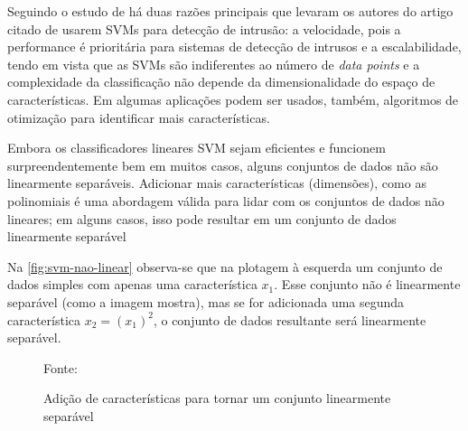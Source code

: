 Seguindo o estudo de  há duas razões principais que levaram os autores do artigo citado de usarem SVMs para detecção de intrusão: a velocidade, pois a performance é prioritária para sistemas de detecção de intrusos e a escalabilidade, tendo em vista que as SVMs são indiferentes ao número de \textit{data points} e a complexidade da classificação não depende da dimensionalidade do espaço de características. Em algumas aplicações podem ser usados, também, algoritmos de otimização para identificar mais características.


Embora os classificadores lineares SVM sejam eficientes e funcionem surpreendentemente bem em muitos casos, alguns conjuntos de dados não são linearmente separáveis. Adicionar mais características (dimensões), como as polinomiais é uma abordagem válida para lidar com os conjuntos de dados não lineares; em alguns casos, isso pode resultar em um conjunto de dados linearmente separável \cite[p. 153]{geron_maos_2020}

Na \autoref{fig:svm-nao-linear} observa-se que na plotagem à esquerda um conjunto de dados simples com apenas uma característica $ x_1$. Esse conjunto não é linearmente separável (como a imagem mostra), mas se for adicionada uma segunda característica $ x_2 = (x_1)^2 $, o conjunto de dados resultante será linearmente separável.

\begin{figure}[h!]
	\centering
	\caption{Adição de características para tornar um conjunto linearmente separável}
	
	\label{fig:svm-nao-linear}
	{\scriptsize 	Fonte: }
\end{figure}

